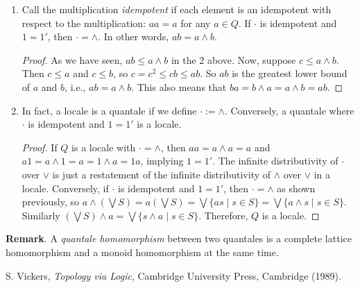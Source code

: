 \documentclass[12pt]{article}
\begin{document}
\begin{enumerate}
\item
Call the multiplication \emph{idempotent} if each element is an idempotent with respect to the multiplication: $aa=a$ for any $a\in Q$.  If $\cdot$ is idempotent and $1=1'$, then $\cdot =\wedge$.  In other words, $ab=a\wedge b$.  
\begin{proof}
As we have seen, $ab\le a\wedge b$ in the 2 above.  Now, suppose $c\le a\wedge b$.  Then $c\le a$ and $c\le b$, so $c=c^2\le cb\le ab$.  So $ab$ is the greatest lower bound of $a$ and $b$, i.e., $ab=a\wedge b$.  This also means that $ba=b\wedge a=a\wedge b=ab$.
\end{proof}
\item
In fact, a locale is a quantale if we define $\cdot:=\wedge$.  Conversely, a quantale where $\cdot$ is idempotent and $1=1'$ is a locale.
\begin{proof}
If $Q$ is a locale with $\cdot=\wedge$, then $aa=a\wedge a=a$ and $a1=a\wedge 1=a=1\wedge a=1a$, implying $1=1'$.  The infinite distributivity of $\cdot$ over $\vee$ is just a restatement of the infinite distributivity of $\wedge$ over $\vee$ in a locale.  Conversely, if $\cdot$ is idempotent and $1=1'$, then $\cdot=\wedge$ as shown previously, so $a\wedge (\bigvee S)=a (\bigvee S)=\bigvee \lbrace as\mid s\in S\rbrace =\bigvee \lbrace a\wedge s\mid s\in S\rbrace$.  Similarly $(\bigvee S) \wedge a = \bigvee \lbrace s\wedge a\mid s\in S\rbrace$.  Therefore, $Q$ is a locale.
\end{proof}

\end{enumerate}

\textbf{Remark}.  A \emph{quantale homomorphism} between two quantales is a complete lattice homomorphism and a monoid homomorphism at the same time.

\begin{thebibliography}{8}
 S. Vickers, {\em Topology via Logic}, Cambridge University Press, Cambridge (1989).
\end{thebibliography}
\end{document}
